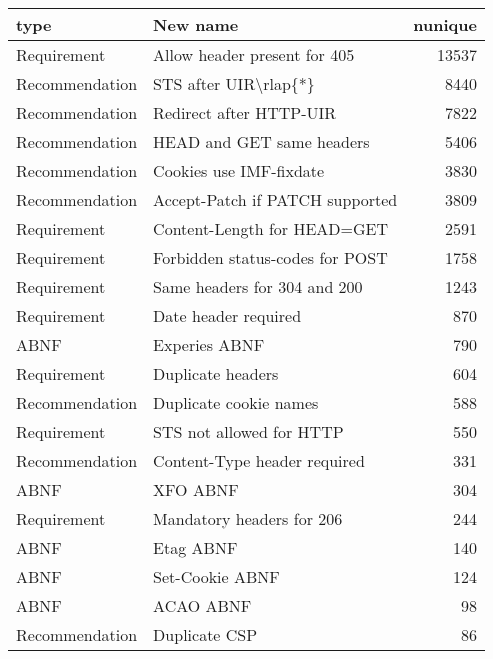 \begin{tabular}{llr}
\toprule
          type &                                    New name &  nunique \\
\midrule
   Requirement &                Allow header present for 405 &    13537 \\
Recommendation &                       STS after UIR\textbackslash rlap\{*\} &     8440 \\
Recommendation &                     Redirect after HTTP-UIR &     7822 \\
Recommendation &                   HEAD and GET same headers &     5406 \\
Recommendation &                     Cookies use IMF-fixdate &     3830 \\
Recommendation &             Accept-Patch if PATCH supported &     3809 \\
   Requirement &                 Content-Length for HEAD=GET &     2591 \\
   Requirement &             Forbidden status-codes for POST &     1758 \\
   Requirement &                Same headers for 304 and 200 &     1243 \\
   Requirement &                        Date header required &      870 \\
          ABNF &                               Experies ABNF &      790 \\
   Requirement &                           Duplicate headers &      604 \\
Recommendation &                      Duplicate cookie names &      588 \\
   Requirement &                    STS not allowed for HTTP &      550 \\
Recommendation &                Content-Type header required &      331 \\
          ABNF &                                    XFO ABNF &      304 \\
   Requirement &                   Mandatory headers for 206 &      244 \\
          ABNF &                                   Etag ABNF &      140 \\
          ABNF &                             Set-Cookie ABNF &      124 \\
          ABNF &                                   ACAO ABNF &       98 \\
Recommendation &                               Duplicate CSP &       86 \\

\end{tabular}
